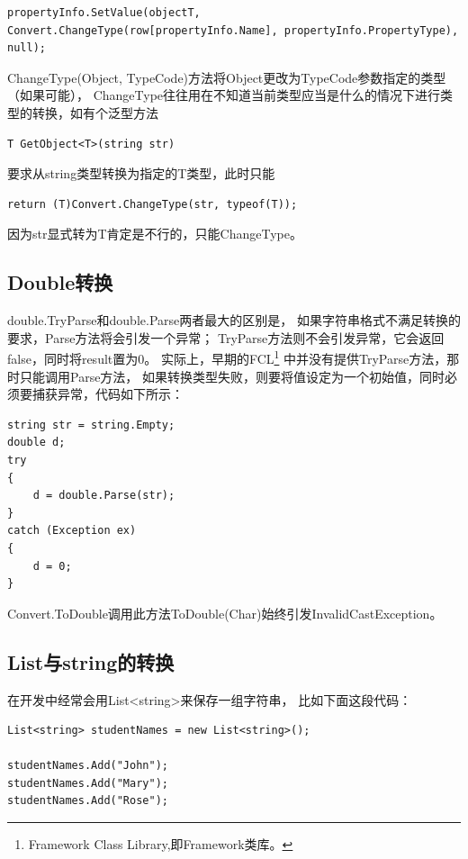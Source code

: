 \documentclass{book}
\begin{document}
\begin{lstlisting}[language={[Sharp]C}]
propertyInfo.SetValue(objectT, Convert.ChangeType(row[propertyInfo.Name], propertyInfo.PropertyType), null);
\end{lstlisting}

ChangeType(Object, TypeCode)方法将Object更改为TypeCode参数指定的类型（如果可能），
ChangeType往往用在不知道当前类型应当是什么的情况下进行类型的转换，如有个泛型方法

\begin{lstlisting}[language={[Sharp]C}]
T GetObject<T>(string str)
\end{lstlisting}

要求从string类型转换为指定的T类型，此时只能

\begin{lstlisting}[language={[Sharp]C}]
return (T)Convert.ChangeType(str, typeof(T));
\end{lstlisting}

因为str显式转为T肯定是不行的，只能ChangeType。

\subsection{Double转换}

double.TryParse和double.Parse两者最大的区别是，
如果字符串格式不满足转换的要求，Parse方法将会引发一个异常；
TryParse方法则不会引发异常，它会返回false，同时将result置为0。
实际上，早期的FCL\footnote{Framework Class Library,即Framework类库。}
中并没有提供TryParse方法，那时只能调用Parse方法，
如果转换类型失败，则要将值设定为一个初始值，同时必须要捕获异常，代码如下所示：

\begin{lstlisting}[language={[Sharp]C}]
string str = string.Empty;  
double d;  
try  
{  
    d = double.Parse(str);  
}  
catch (Exception ex)  
{  
    d = 0;  
}
\end{lstlisting}

Convert.ToDouble调用此方法ToDouble(Char)始终引发InvalidCastException。

\subsection{List与string的转换}

在开发中经常会用List<string>来保存一组字符串，
比如下面这段代码：

\begin{lstlisting}[language={[Sharp]C}]
List<string> studentNames = new List<string>();

studentNames.Add("John");
studentNames.Add("Mary");
studentNames.Add("Rose");
\end{lstlisting}
\end{document}
